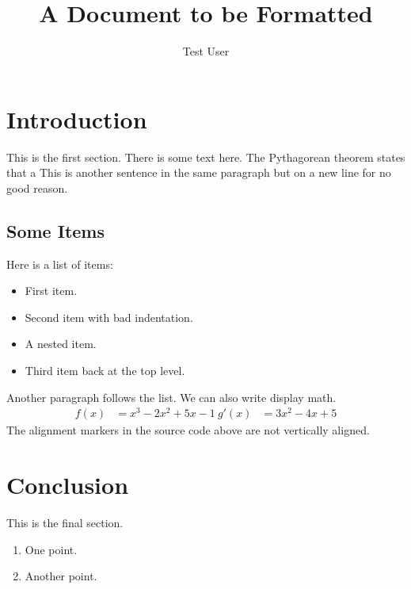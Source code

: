 \documentclass{article}
\title{A Document to be Formatted}
\author{Test User}
\begin{document}
\maketitle

\section{Introduction} This is the first section.
There is some text here. The Pythagorean theorem states that a
This is another sentence in the same paragraph but on a new line for no good reason.

\subsection{Some Items}
Here is a list of items:
\begin{itemize}
	\item First item.
	\item Second item with bad indentation.
	\item A nested item.
	\item Third item back at the top level.
\end{itemize}

Another paragraph follows the list. We can also write display math.
\begin{align*}
	f(x)  & = x^3 - 2x^2 + 5x - 1 \
	g'(x) & = 3x^2 - 4x+5
\end{align*}
The alignment markers in the source code above are not vertically aligned.

\section{Conclusion}
This is the final section.
\begin{enumerate}
	\item One point.
	\item Another point.
\end{enumerate}
\end{document}
